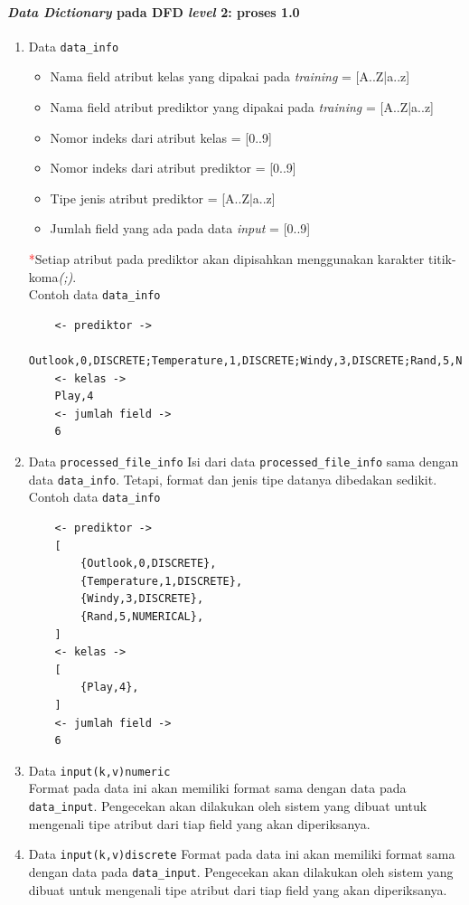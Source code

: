 \paragraph{\textit{Data Dictionary} pada DFD \textit{level} 2: proses 1.0}
\begin{enumerate}
	\item{Data \verb|data_info|}
		\begin{itemize}
			\item Nama field atribut kelas yang dipakai pada \textit{training} = [A..Z|a..z]
			\item Nama field atribut prediktor yang dipakai pada \textit{training} = [A..Z|a..z]
			\item Nomor indeks dari atribut kelas = [0..9]
			\item Nomor indeks dari atribut prediktor = [0..9]
			\item Tipe jenis atribut prediktor = [A..Z|a..z]
			\item Jumlah field yang ada pada data \textit{input} = [0..9]
		\end{itemize}
		 \textcolor{red}{*}Setiap atribut pada prediktor akan dipisahkan menggunakan karakter titik-koma\textit{(;)}.\\
	Contoh data \verb|data_info|
	\begin{lstlisting}
	<- prediktor ->
	Outlook,0,DISCRETE;Temperature,1,DISCRETE;Windy,3,DISCRETE;Rand,5,NUMERICAL
	<- kelas ->
	Play,4
	<- jumlah field ->
	6
	\end{lstlisting}
	
	\item{Data \verb|processed_file_info|}
	Isi dari data \verb|processed_file_info| sama dengan data \verb|data_info|. Tetapi, format dan jenis tipe datanya dibedakan sedikit.
	Contoh data \verb|data_info|
	\begin{lstlisting}
	<- prediktor ->
	[
		{Outlook,0,DISCRETE},
		{Temperature,1,DISCRETE},
		{Windy,3,DISCRETE},
		{Rand,5,NUMERICAL},
	]
	<- kelas ->
	[
		{Play,4},
	]
	<- jumlah field ->
	6
	\end{lstlisting}	
	
	\item{Data \verb|input(k,v)numeric|}\\
	Format pada data ini akan memiliki format sama dengan data pada \verb|data_input|. Pengecekan akan dilakukan oleh sistem yang dibuat untuk mengenali tipe atribut dari tiap field yang akan diperiksanya.	
	
	\item{Data \verb|input(k,v)discrete|}
	Format pada data ini akan memiliki format sama dengan data pada \verb|data_input|. Pengecekan akan dilakukan oleh sistem yang dibuat untuk mengenali tipe atribut dari tiap field yang akan diperiksanya.


\end{enumerate}
